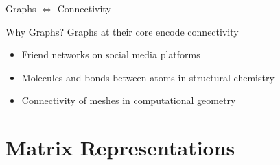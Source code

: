 \documentclass{beamer}
\begin{document}
\begin{frame}{Graphs $\Leftrightarrow$ Connectivity}
    \begin{block}{Why Graphs?}
        Graphs at their core encode connectivity
        \begin{itemize}
            \item<2-> Friend networks on social media platforms
            \item<3-> Molecules and bonds between atoms in structural chemistry
            \item<4-> Connectivity of meshes in computational geometry
        \end{itemize}
    \end{block}

\end{frame}

\section{Matrix Representations}
\end{document}
